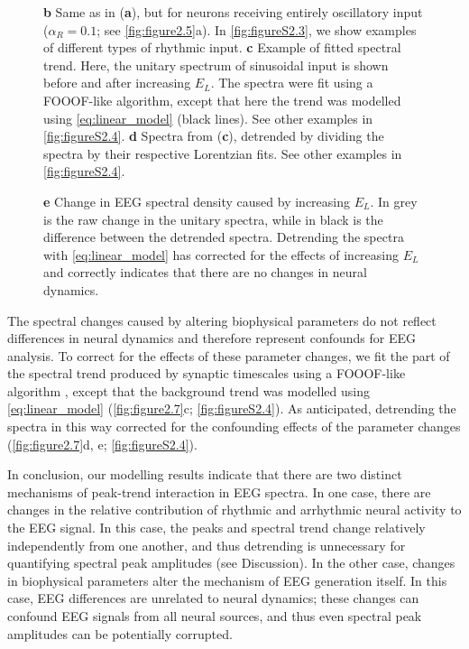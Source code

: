 \begin{figure}
\begin{minipage}[c]{70mm}
{	\textbf{b} Same as in (\textbf{a}), but for neurons receiving entirely oscillatory input ($\alpha_R=0.1$; see \autoref{fig:figure2.5}a). In \autoref{fig:figureS2.3}, we show examples of different types of rhythmic input.
	\textbf{c} Example of fitted spectral trend. Here, the unitary spectrum of sinusoidal input is shown before and after increasing $E_L$. The spectra were fit using a FOOOF-like algorithm\cite{Donoghue2020}, except that here the trend was modelled using \ref{eq:linear_model} (black lines). See other examples in \autoref{fig:figureS2.4}.
        \textbf{d} Spectra from (\textbf{c}), detrended by dividing the spectra by their respective Lorentzian fits. See other examples in \autoref{fig:figureS2.4}. 
    } \label{fig:figure2.7}
  \end{minipage}
  \begin{minipage}[c]{\textwidth}
    \vspace*{-0.72cm} \footnotesize \singlespacing
	\textbf{e} Change in EEG spectral density caused by increasing $E_L$. In grey is the raw change in the unitary spectra, while in black is the difference between the detrended spectra. Detrending the spectra with \ref{eq:linear_model} has corrected for the effects of increasing $E_L$ and correctly indicates that there are no changes in neural dynamics. 
  \end{minipage}
\end{figure}

The spectral changes caused by altering biophysical parameters do not reflect differences in neural dynamics and therefore represent confounds for EEG analysis. To correct for the effects of these parameter changes, we fit the part of the spectral trend produced by synaptic timescales using a FOOOF-like algorithm \cite{Donoghue2020}, except that the background trend was modelled using \ref{eq:linear_model} (\autoref{fig:figure2.7}c; \autoref{fig:figureS2.4}). As anticipated, detrending the spectra in this way corrected for the confounding effects of the parameter changes (\autoref{fig:figure2.7}d, e; \autoref{fig:figureS2.4}).

In conclusion, our modelling results indicate that there are two distinct mechanisms of peak-trend interaction in EEG spectra. In one case, there are changes in the relative contribution of rhythmic and arrhythmic neural activity to the EEG signal. In this case, the peaks and spectral trend change relatively independently from one another, and thus detrending is unnecessary for quantifying spectral peak amplitudes (see Discussion). In the other case, changes in biophysical parameters alter the mechanism of EEG generation itself. In this case, EEG differences are unrelated to neural dynamics; these changes can confound EEG signals from all neural sources, and thus even spectral peak amplitudes can be potentially corrupted.

